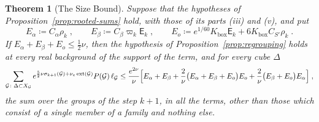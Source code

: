 \documentclass[11pt]{preprint}
\numberwithin{equation}{section}
\newtheorem{theorem}{Theorem}[section]
\theoremstyle{definition}
\theoremstyle{remark}
\theoremstyle{plain}
\begin{document}
\begin{theorem}[The Size Bound]\label{thm:size-bound}
Suppose that the hypotheses of Proposition~\ref{prop:rooted-sums} hold, with those of its parts (iii) and (v), and put
\begin{equation}\label{eq:rooted-totals}
    E_\alpha \coloneqq C_\alpha\rho_k\;,
    \qquad
    E_\beta \coloneqq C_\beta\varpi_k\mathsf E_k\;,
    \qquad
    E_o \coloneqq e^{1/60}K_{\mathrm{box}}\mathsf E_k + 6K_{\mathrm{box}}C_{S'}\rho_k\;.
\end{equation}
If $E_\alpha + E_\beta + E_o \leq \frac12\nu$, then the hypothesis of Proposition~\ref{prop:regrouping} holds at every real background of the support of the term, and for every cube $\Delta$
\begin{equation}\label{eq:size-bound-new}
    \sum_{\mathcal G\colon \Delta \subset X_{\mathcal G}}e^{\frac52\nu\sigma_{k+1}(\mathcal G) + \nu_e\operatorname{ext}(\mathcal G)}P(\mathcal G)\,\ell_{\mathcal G} \leq \frac{e^{2\nu}}{\nu}\Bigl[E_\alpha + E_\beta + \frac{2}{\nu}\bigl(E_\alpha + E_\beta + E_o\bigr)E_o + \frac{2}{\nu}\bigl(E_\beta + E_o\bigr)E_\alpha\Bigr]\;,
\end{equation}
the sum over the groups of the step $k + 1$, in all the terms, other than those which consist of a single member of a family and nothing else.
\end{theorem}
\end{document}
